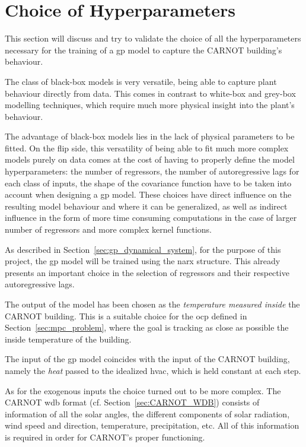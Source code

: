 \section{Choice of Hyperparameters}

This section will discuss and try to validate the choice of all the
hyperparameters necessary for the training of a \acrshort{gp} model to capture
the CARNOT building's behaviour.

The class of black-box models is very versatile, being able to capture plant
behaviour directly from data. This comes in contrast to white-box and grey-box
modelling techniques, which require much more physical insight into the plant's
behaviour.

The advantage of black-box models lies in the lack of physical parameters to be
fitted. On the flip side, this versatility of being able to fit much more
complex models purely on data comes at the cost of having to properly define the
model hyperparameters: the number of regressors, the number of autoregressive
lags for each class of inputs, the shape of the covariance function have to be
taken into account when designing a \acrshort{gp} model. These choices have
direct influence on the resulting model behaviour and where it can be
generalized, as well as indirect influence in the form of more time consuming
computations in the case of larger number of regressors and more complex kernel
functions.

As described in Section~\ref{sec:gp_dynamical_system}, for the purpose of this
project, the \acrlong{gp} model will be trained using the \acrshort{narx}
structure. This already presents an important choice in the selection of
regressors and their respective autoregressive lags.

The output of the model has been chosen as the \textit{temperature measured
inside} the CARNOT building. This is a suitable choice for the \acrshort{ocp}
defined in Section~\ref{sec:mpc_problem}, where the goal is tracking as close as
possible the inside temperature of the building.

The input of the \acrshort{gp} model coincides with the input of the CARNOT
building, namely the \textit{heat} passed to the idealized \acrshort{hvac},
which is held constant at each step.

As for the exogenous inputs the choice turned out to be more complex. The CARNOT
\acrshort{wdb} format (cf. Section~\ref{sec:CARNOT_WDB}) consists of information
of all the solar angles, the different components of solar radiation, wind speed
and direction, temperature, precipitation, etc. All of this information is
required in order for CARNOT's proper functioning. 

